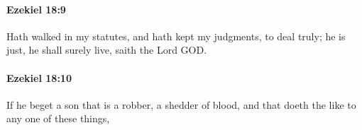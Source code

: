 		\paragraph{Ezekiel 18:9} %
			\label{EZEKIEL-18-9}

			Hath walked in my statutes, and hath kept my judgments, to deal truly; he is just, he shall surely live, saith the Lord GOD.


		\paragraph{Ezekiel 18:10} %
			\label{EZEKIEL-18-10}

			If he beget a son that is a robber, a shedder of blood, and that doeth the like to any one of these things,


